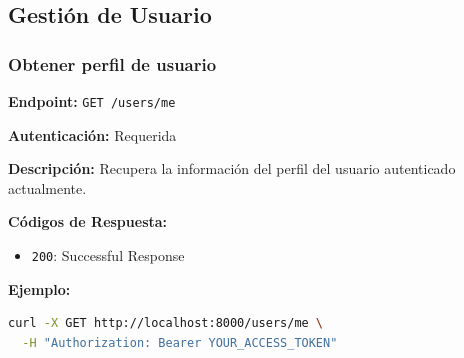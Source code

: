 \subsection{Gestión de Usuario}
\label{subsection:A-3-Gestión de Usuario}

\subsubsection{Obtener perfil de usuario}
\label{subsubsection:A-3-Obtener perfil de usuario}

\textbf{Endpoint:} \texttt{GET /users/me}

\textbf{Autenticación:} Requerida

\textbf{Descripción:} Recupera la información del perfil del usuario autenticado actualmente.

\textbf{Códigos de Respuesta:}
\begin{itemize}
    \item \texttt{200}: Successful Response
\end{itemize}

\textbf{Ejemplo:}

\begin{lstlisting}[language=bash]
curl -X GET http://localhost:8000/users/me \
  -H "Authorization: Bearer YOUR_ACCESS_TOKEN"
\end{lstlisting}

